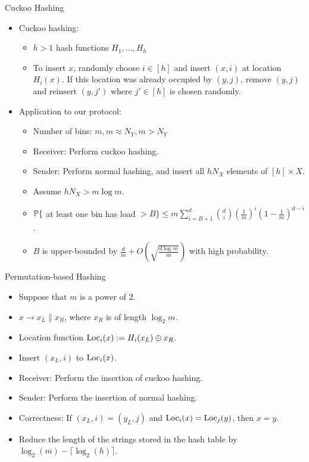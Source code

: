 \begin{frame}{Cuckoo Hashing}
\begin{itemize}
\item Cuckoo hashing:
\begin{itemize}
\item $h>1$ hash functions $H_1, \dots, H_h$
\item To insert $x$, randomly choose $i\in[h]$ and insert $(x, i)$ at location $H_i(x)$. If this location was already occupied by $(y, j)$, remove $(y, j)$ and reinsert $(y, j')$ where $j'\in[h]$ is chosen randomly.
\end{itemize}
\item Application to our protocol:
\begin{itemize}
\item Number of bins: $m, m\approx N_Y, m>N_Y$
\item Receiver: Perform cuckoo hashing.
\item Sender: Perform normal hashing, and insert all $hN_X$ elements of $[h]\times X$.
\item Assume $hN_X>m\log m$.
\item $\P\{$ at least one bin has load $>B\}\leq m\sum_{i=B+1}^d\binom di(\frac1m)^i(1-\frac1m)^{d-i}$.
\item $B$ is upper-bounded by $\frac dm+O(\sqrt{\frac{d\log m}m})$ with high probability.
\end{itemize}
\end{itemize}
\end{frame}

\begin{frame}{Permutation-based Hashing}
\begin{itemize}
\item Suppose that $m$ is a power of $2$.
\item $x\to x_L\|x_R$, where $x_R$ is of length $\log_2m$.
\item Location function $\loc_i(x):=H_i(x_L)\oplus x_R$.
\item Insert $(x_L, i)$ to $\loc_i(x)$.
\item Receiver: Perform the insertion of cuckoo hashing.
\item Sender: Perform the insertion of normal hashing.
\item Correctness: If $(x_L, i)=(y_L, j)$ and $\loc_i(x)=\loc_j(y)$, then $x=y$.
\item Reduce the length of the strings stored in the hash table by $\log_2(m)-\lceil\log_2(h)\rceil$.
\end{itemize}
\end{frame}

